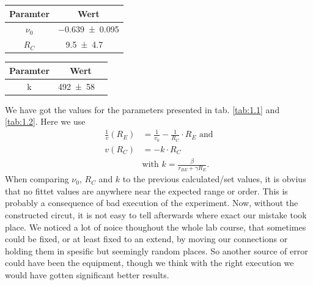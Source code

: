\documentclass[a4paper,10pt]{article}
\newenvironment{Figure}
  {\par\medskip\noindent\minipage{\linewidth}}
  {\endminipage\par\medskip} %
\numberwithin{equation}{section}
\begin{document}
\begin{multicols}{2}
	\begin{Figure}
		\centering\resizebox{\textwidth}{!}{}
		\label{fig:rcconst}
	\end{Figure}
	\begin{Figure}
		\centering\resizebox{\textwidth}{!}{}
		\label{fig:reconst}
	\end{Figure}
	\begin{center}
		\begin{tabular}{|c|c|}
			\hline
			Paramter & Wert                       \\
			\hline
			$\nu_0$  & \SI{-0.639+-0.095}{}       \\
			$R_C$    & \SI{9.5+-4.7}{\kilo\Omega} \\
			\hline
		\end{tabular}
		\label{tab:1.1}
	\end{center}
	\begin{center}
		\begin{tabular}{|c|c|}
			\hline
			Paramter & Wert                                 \\
			\hline
			k        & \SI{492+-58}{\micro\frac{1}{\Omega}} \\
			\hline
		\end{tabular}
		\label{tab:1.2}
	\end{center}
	We have got the values for the parameters presented in tab. \ref{tab:1.1} and \ref{tab:1.2}. Here we use
	\begin{align*}
		\frac{1}{v}(R_E) & = \frac{1}{v_0} - \frac{1}{R_C} \cdot R_E \text{ and} \\
		v(R_C)           & = - k \cdot R_C                                       \\
                     & \text{with }k=\frac{\beta}{r_{BE} + \gamma R_E} \text{.}
	\end{align*}
When comparing $\nu_0$, $R_C$ and $k$ to the previous calculated/set values, it is obvius that no fittet values are anywhere near the expected range or order. This is probably a consequence of bad execution of the experiment. Now, without the constructed circut, it is not easy to tell afterwards where exact our mistake took place. We noticed a lot of noice thoughout the whole lab course, that sometimes could be fixed, or at least fixed to an extend, by moving our connections or holding them in spesific but seemingly random places. So another source of error could have been the equipment, though we think with the right execution we would have gotten significant better results.







\end{multicols}
\end{document}
